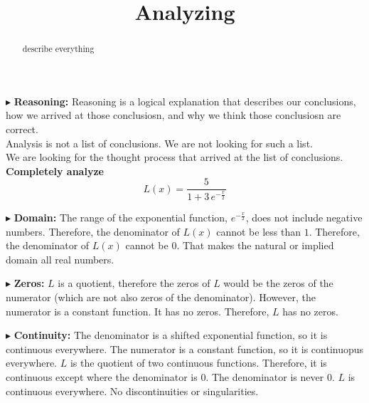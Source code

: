 \documentclass{ximera}
\title{Analyzing}
\begin{document}
\begin{abstract}
describe everything
\end{abstract}
\maketitle







$\blacktriangleright$ \textbf{\textcolor{red!80!black}{Reasoning:}} Reasoning is a logical explanation that describes our conclusions, how we arrived at those conclusiosn, and why we think those conclusiosn are correct. \\

Analysis is not a list of conclusions. We are not looking for such a list. \\

We are looking for the thought process that arrived at the list of conclusions. \\




\textbf{Completely analyze} \\


\[   L(x) = \frac{5}{1 + 3 \, e^{-\tfrac{x}{2}}} \]




$\blacktriangleright$  \textbf{Domain:} The range of the exponential function, $e^{-\tfrac{x}{2}}$, does not include negative numbers. Therefore, the denominator of $L(x)$ cannot be less than $1$. Therefore, the denominator of $L(x)$ cannot be $0$.  That makes the natural or implied domain all real numbers.


$\blacktriangleright$ \textbf{Zeros:} $L$ is a quotient, therefore the zeros of $L$ would be the zeros of the numerator (which are not also zeros of the denominator).  However, the numerator is a constant function.  It has no zeros. Therefore, $L$ has no zeros.



$\blacktriangleright$ \textbf{Continuity:} The denominator is a shifted exponential function, so it is continuous everywhere. The numerator is a constant function, so it is continuopus everywhere.  $L$ is the quotient of two continuous functions.  Therefore, it is continuous except where the denominator is $0$.  The denominator is never $0$. $L$ is continuous everywhere.  No discontinuities or singularities.
\end{document}
